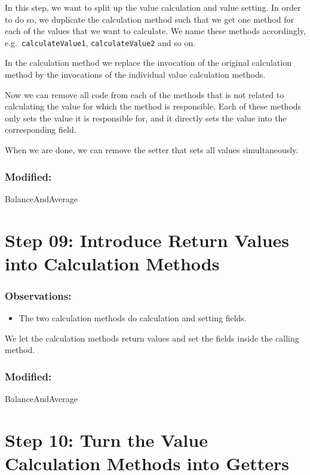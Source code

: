 \documentclass[a4paper,fleqn,titlepage,11pt]{article}
\begin{document}
In this step, we want to split up the value calculation and value setting. In order to do so, we duplicate the calculation method such that we get one method for each of the values that we want to calculate. We name these methods accordingly, e.g.~\texttt{calculateValue1}, \texttt{calculateValue2} and so on.

In the calculation method we replace the invocation of the original calculation method by the invocations of the individual value calculation methods.

Now we can remove all code from each of the methods that is not related to calculating the value for which the method is responsible. Each of these methods only sets the value it is responsible for, and it directly sets the value into the corresponding field.

When we are done, we can remove the setter that sets all values simultaneously.

\subsubsection*{Modified:}

BalanceAndAverage

\section*{Step 09: Introduce Return Values into Calculation Methods}
\subsubsection*{Observations:}
\begin{itemize}
\item The two calculation methods do calculation and setting fields. 
\end{itemize}

We let the calculation methods return values and set the fields inside the calling method.

\subsubsection*{Modified:}

BalanceAndAverage

\section*{Step 10: Turn the Value Calculation Methods into Getters}
\end{document}
